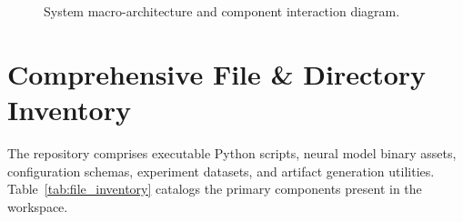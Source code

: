 \documentclass[11pt,a4paper]{article}
\begin{document}
\begin{figure}[H]
\caption{System macro-architecture and component interaction diagram.}
\label{fig:macro_arch}
\end{figure}

\section{Comprehensive File \& Directory Inventory}

The repository comprises executable Python scripts, neural model binary assets, configuration schemas, experiment datasets, and artifact generation utilities. Table~\ref{tab:file_inventory} catalogs the primary components present in the workspace.
\end{document}
